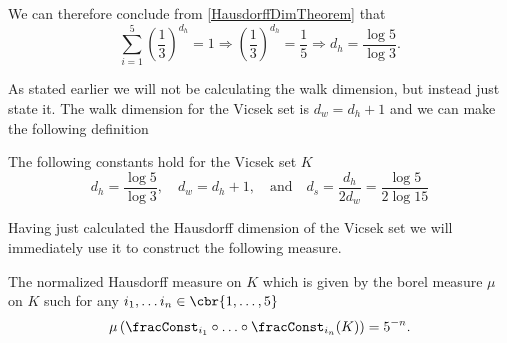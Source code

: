 We can therefore conclude from \cref{HausdorffDimTheorem} that 
\begin{equation}
	\sum_{i=1}^{5} \left(\frac{1}{3}\right)^{d_h} = 1 \Rightarrow \left(\frac{1}{3}\right)^{d_h} = \frac{1}{5} \Rightarrow d_h = \frac{\log 5}{\log 3}.
\end{equation}

As stated earlier we will not be calculating the walk dimension, but instead just state it. The walk dimension for the Vicsek set is $d_w = d_h +1$ and we can make the following definition
\begin{defi}\label{defiDimensionsOfVicsek}
		The following constants hold for the Vicsek set $K$
		\begin{equation}
			d_h= \frac{\log 5}{\log 3}, \quad d_w = d_h +1, \quad \text{and} \quad d_s = \frac{d_h}{2d_w} = \frac{\log 5}{2 \log 15}
		\end{equation}
\end{defi}

Having just calculated the Hausdorff dimension of the Vicsek set we will immediately use it to construct the following measure.
\begin{defi}\label{normalziedHausdorffMeasure}
	The normalized Hausdorff measure on $K$ which is given by the borel measure $\mu$ on $K$ such for any $i_1, \ldots i_n \in \cbr{1, \ldots, 5}$
	\begin{equation}
		\mu\left(\fracConst_{i_1} \circ \ldots \circ \fracConst_{i_n}(K)\right) = 5^{-n}.
	\end{equation}
\end{defi}

